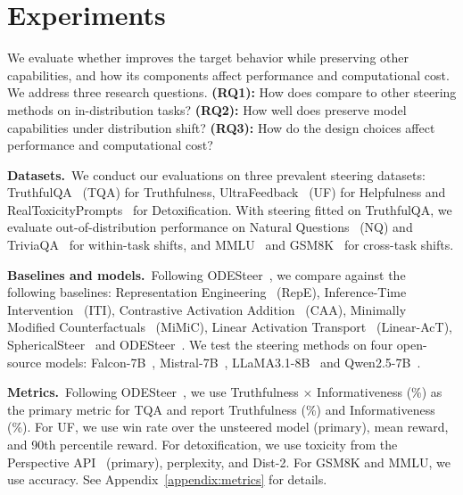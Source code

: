 \vspace{-1mm}
\section{Experiments}
\label{sec:exp}
\vspace{-1mm}

We evaluate whether \Cobras improves the target behavior while preserving other capabilities, and how its components affect performance and computational cost. We address three research questions. \textbf{(RQ1):} How does \Cobras compare to other steering methods on in-distribution tasks? \textbf{(RQ2):} How well does \Cobras preserve model capabilities under distribution shift? \textbf{(RQ3):} How do the design choices affect performance and computational cost?

\noindent\textbf{Datasets.}~We conduct our evaluations on three prevalent steering datasets: TruthfulQA~\cite{lin2021truthfulqa} (TQA) for Truthfulness, UltraFeedback~\cite{cui2023ultrafeedback} (UF) for Helpfulness and RealToxicityPrompts~\cite{gehman2020realtoxicityprompts} for Detoxification. With steering fitted on TruthfulQA, we evaluate out-of-distribution performance on Natural Questions~\cite{kwiatkowski2019natural} (NQ) and TriviaQA~\cite{joshi2017triviaqa} for within-task shifts, and MMLU~\cite{hendrycks2020measuring} and GSM8K~\cite{cobbe2021gsm8k} for cross-task shifts.

\noindent\textbf{Baselines and models.}~Following ODESteer~\cite{zhaoodesteer}, we compare \Cobras against the following baselines: Representation Engineering~\citep{zou2023representation} (RepE), Inference-Time Intervention~\citep{li2023inference} (ITI), Contrastive Activation Addition~\citep{rimsky2024steering} (CAA), Minimally Modified Counterfactuals~\citep{singh2024representation} (MiMiC), Linear Activation Transport~\citep{rodriguez2025controlling} (Linear-AcT), SphericalSteer~\cite{you2026spherical} and ODESteer~\cite{zhaoodesteer}. We test the steering methods on four open-source models: Falcon-7B~\citep{almazrouei2023falcon}, Mistral-7B~\citep{jiang2023mistral7b}, LLaMA3.1-8B~\citep{meta2024llama3.1} and Qwen2.5-7B~\cite{qwen2.5}.

\noindent\textbf{Metrics.}~Following ODESteer~\cite{zhaoodesteer}, we use Truthfulness $\times$ Informativeness (\%) as the primary metric for TQA and report Truthfulness (\%) and Informativeness (\%). For UF, we use win rate over the unsteered model (primary), mean reward, and 90th percentile reward. For detoxification, we use toxicity from the Perspective API~\cite{perspective_api} (primary), perplexity, and Dist-2. For GSM8K and MMLU, we use accuracy. See Appendix~\ref{appendix:metrics} for details.

